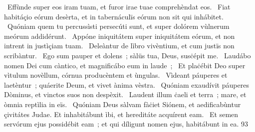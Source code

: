 {~Effùnde super eos iram tuam, et furor irae tuae comprehèndat eos.
~Fiat habitáçio eórum desèrta, et in tabernáculïs eórum non sit qui inhábitet.
~Quóniam quem tu percussìsti persecúti sunt, et super dolórem vùlnerum meórum addidérunt.
~Appóne iniquitátem super iniquitátem eórum, et non intrent in justìçiam tuam.
~Deleàntur de lìbro vivèntium, et cum justïs non scribàntur.
~Ego sum pauper et dolens~; sàlüs tua, Deus, susċépit me.
~Laudábo nomen Dei cum càntico, et magnificábo eum in laude~;
~Et plaċébit Deo super vìtulum novèllum, córnua producèntem et ùngulas.
~Vìdeant páuperes et laetèntur~; quáerite Deum, et vivet ànima vèstra.
~Quóniam exaudívit páuperes Dòminus, et vinctos suos non despèxit.
~Laudent illum ċaeli et terra~; mare, et òmnia reptìlia in eïs.
~Quóniam Deus sàlvam fàċiet Siónem, et aedificabùntur çivitátes Judae. Et inhabitábunt ìbi, et hereditáte acquírent eam.
~Et semen servórum ejus possidébit eam~; et qui díligunt nomen ejus, habitábunt in ea.
}
{9}{3}
